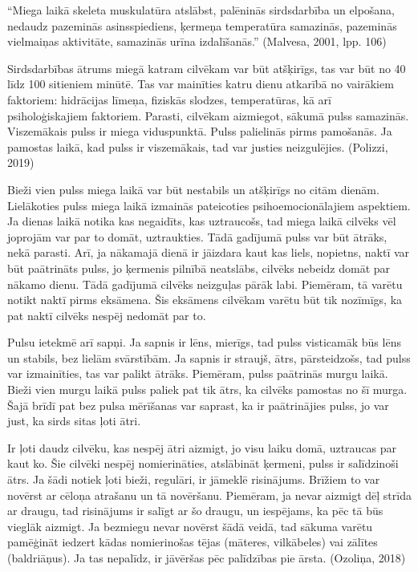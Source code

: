 \documentclass[12pt]{article}
\begin{document}
“Miega laikā skeleta muskulatūra atslābst, palēninās sirdsdarbība un elpošana, nedaudz pazeminās asinsspiediens, ķermeņa temperatūra samazinās, pazeminās vielmaiņas aktivitāte, samazinās urīna izdalīšanās.” (Malvesa, 2001, lpp. 106) \par
Sirdsdarbības ātrums miegā katram cilvēkam var būt atšķirīgs, tas var būt no 40 līdz 100 sitieniem minūtē. Tas var mainīties katru dienu atkarībā no vairākiem faktoriem: hidrācijas līmeņa, fiziskās slodzes, temperatūras, kā arī psiholoģiskajiem faktoriem. Parasti, cilvēkam aizmiegot, sākumā pulss samazinās. Viszemākais pulss ir miega viduspunktā. Pulss palielinās pirms pamošanās. Ja pamostas laikā, kad pulss ir viszemākais, tad var justies neizgulējies. (Polizzi, 2019) \par
Bieži vien pulss miega laikā var būt nestabils un atšķirīgs no citām dienām. Lielākoties pulss miega laikā izmainās pateicoties psihoemocionālajiem aspektiem. Ja dienas laikā notika kas negaidīts, kas uztraucošs, tad miega laikā cilvēks vēl joprojām var par to domāt, uztraukties. Tādā gadījumā pulss var būt ātrāks, nekā parasti. Arī, ja nākamajā dienā ir jāizdara kaut kas liels, nopietns, naktī var būt paātrināts pulss, jo ķermenis pilnībā neatslābs, cilvēks nebeidz domāt par nākamo dienu. Tādā gadījumā cilvēks neizguļas pārāk labi. Piemēram, tā varētu notikt naktī pirms eksāmena. Šis eksāmens cilvēkam varētu būt tik nozīmīgs, ka pat naktī cilvēks nespēj nedomāt par to. \par
Pulsu ietekmē arī sapņi. Ja sapnis ir lēns, mierīgs, tad pulss visticamāk būs lēns un stabils, bez lielām svārstībām. Ja sapnis ir straujš, ātrs, pārsteidzošs, tad pulss var izmainīties, tas var palikt ātrāks. Piemēram, pulss paātrinās murgu laikā. Bieži vien murgu laikā pulss paliek pat tik ātrs, ka cilvēks pamostas no šī murga. Šajā brīdī pat bez pulsa mērīšanas var saprast, ka ir paātrinājies pulss, jo var just, ka sirds sitas ļoti ātri. \par
Ir ļoti daudz cilvēku, kas nespēj ātri aizmigt, jo visu laiku domā, uztraucas par kaut ko. Šie cilvēki nespēj nomierināties, atslābināt ķermeni, pulss ir salīdzinoši ātrs. Ja šādi notiek ļoti bieži, regulāri, ir jāmeklē risinājums. Brīžiem to var novērst ar cēloņa atrašanu un tā novēršanu. Piemēram, ja nevar aizmigt dēļ strīda ar draugu, tad risinājums ir salīgt ar šo draugu, un iespējams, ka pēc tā būs vieglāk aizmigt. Ja bezmiegu nevar novērst šādā veidā, tad sākuma varētu pamēģināt iedzert kādas nomierinošas tējas (māteres, vilkābeles) vai zālītes (baldriāņus). Ja tas nepalīdz, ir jāvēršas pēc palīdzības pie ārsta.
 (Ozoliņa, 2018) 
\end{document}

